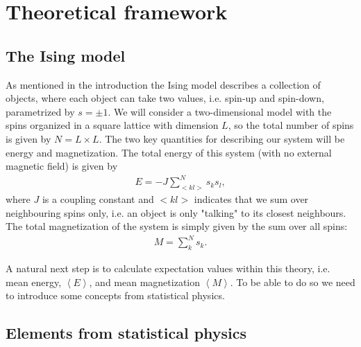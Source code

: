 \documentclass[12pt, a4paper]{article}
\begin{document}
\section{Theoretical framework}

\subsection{The Ising model}

As mentioned in the introduction the Ising model describes a collection of objects, where each object 
can take two values, i.e. spin-up and spin-down, parametrized by $s=\pm 1$. We will consider a 
two-dimensional model with the spins organized in a square lattice with dimension $L$, so the total 
number of spins is given by $N = L\times L$. The two key quantities for describing our system 
will be energy and magnetization. The total energy of this system (with no external magnetic field) 
is given by 
\begin{align}
E = -J\sum_{<kl>}^{N} s_k s_l, 
\end{align}
where $J$ is a coupling constant and $<kl>$ indicates that we sum over neighbouring spins only, i.e. 
an object is only "talking" to its closest neighbours. The total magnetization of the system is simply 
given by the sum over all spins: 
\begin{align} 
M = \sum_k^N s_k. 
\end{align}

A natural next step is to calculate expectation values within this theory, i.e. mean energy, 
$\left\langle E \right\rangle$, and mean magnetization $\left\langle M \right\rangle$. To be able to do 
so we need to introduce some concepts from statistical physics.  

\subsection{Elements from statistical physics}
\end{document}
